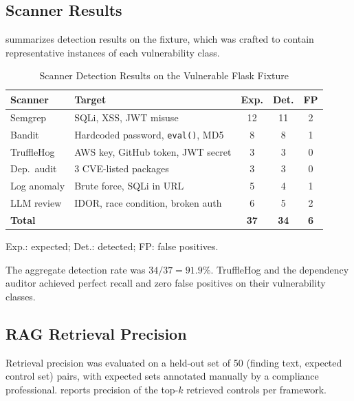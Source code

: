 \documentclass[conference]{IEEEtran}
\newcommand{\tsz}{\footnotesize}
\begin{document}
\subsection{Scanner Results}
 summarizes detection results on the fixture, which
was crafted to contain representative instances of each vulnerability class.

\begin{table}[!t]
\caption{Scanner Detection Results on the Vulnerable Flask Fixture}
\label{tab:scanner_results}
\centering\tsz
\begin{tabularx}{\columnwidth}{@{}lXccc@{}}
\toprule
\textbf{Scanner} & \textbf{Target} & \textbf{Exp.} & \textbf{Det.} & \textbf{FP}\\
\midrule
Semgrep     & SQLi, XSS, JWT misuse & 12 & 11 & 2\\
Bandit      & Hardcoded password, \texttt{eval()}, MD5 & 8 & 8 & 1\\
TruffleHog  & AWS key, GitHub token, JWT secret & 3 & 3 & 0\\
Dep.\ audit & 3 CVE-listed packages & 3 & 3 & 0\\
Log anomaly & Brute force, SQLi in URL & 5 & 4 & 1\\
LLM review  & IDOR, race condition, broken auth & 6 & 5 & 2\\
\midrule
\textbf{Total} & & \textbf{37} & \textbf{34} & \textbf{6}\\
\bottomrule
\end{tabularx}
\par\smallskip\raggedright\scriptsize Exp.: expected; Det.: detected; FP: false positives.
\end{table}

The aggregate detection rate was $34/37 = 91.9\%$. TruffleHog and the dependency
auditor achieved perfect recall and zero false positives on their vulnerability
classes.

\subsection{RAG Retrieval Precision}
Retrieval precision was evaluated on a held-out set of 50 (finding text,
expected control set) pairs, with expected sets annotated manually by a
compliance professional.  reports precision of the top-$k$
retrieved controls per framework.
\end{document}
